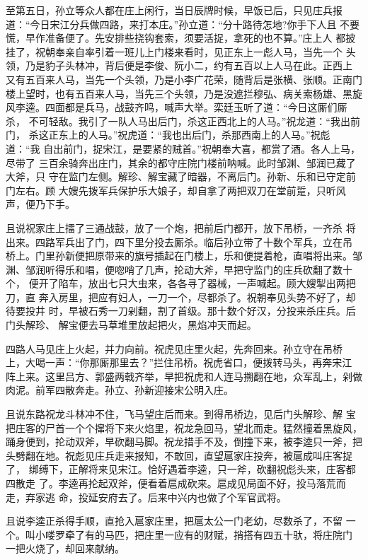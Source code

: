 至第五日，孙立等众人都在庄上闲行，当日辰牌时候，早饭已后，只见庄兵报
道：“今日宋江分兵做四路，来打本庄。”孙立道：“分十路待怎地?你手下人且
不要慌，早作准备便了。先安排些挠钩套索，须要活捉，拿死的也不算。”庄上人
都披挂了，祝朝奉亲自率引着一班儿上门楼来看时，见正东上一彪人马，当先一个
头领，乃是豹子头林冲，背后便是李俊、阮小二，约有五百以上人马在此。正西上
又有五百来人马，当先一个头领，乃是小李广花荣，随背后是张横、张顺。正南门
楼上望时，也有五百来人马，当先三个头领，乃是没遮拦穆弘、病关索杨雄、黑旋
风李逵。四面都是兵马，战鼓齐鸣，喊声大举。栾廷玉听了道：“今日这厮们厮杀，
不可轻敌。我引了一队人马出后门，杀这正西北上的人马。”祝龙道：“我出前门，
杀这正东上的人马。”祝虎道：“我也出后门，杀那西南上的人马。”祝彪道：“我
自出前门，捉宋江，是要紧的贼首。”祝朝奉大喜，都赏了酒。各人上马，尽带了
三百余骑奔出庄门，其余的都守庄院门楼前呐喊。此时邹渊、邹润已藏了大斧，只
守在监门左侧。解珍、解宝藏了暗器，不离后门。孙新、乐和已守定前门左右。顾
大嫂先拨军兵保护乐大娘子，却自拿了两把双刀在堂前踅，只听风声，便乃下手。

且说祝家庄上擂了三通战鼓，放了一个炮，把前后门都开，放下吊桥，一齐杀
将出来。四路军兵出了门，四下里分投去厮杀。临后孙立带了十数个军兵，立在吊
桥上。门里孙新便把原带来的旗号插起在门楼上，乐和便提着枪，直唱将出来。邹
渊、邹润听得乐和唱，便唿哨了几声，抡动大斧，早把守监门的庄兵砍翻了数十个，
便开了陷车，放出七只大虫来，各各寻了器械，一声喊起。顾大嫂掣出两把刀，直
奔入房里，把应有妇人，一刀一个，尽都杀了。祝朝奉见头势不好了，却待要投井
时，早被石秀一刀剁翻，割了首级。那十数个好汉，分投来杀庄兵。后门头解珍、
解宝便去马草堆里放起把火，黑焰冲天而起。

四路人马见庄上火起，并力向前。祝虎见庄里火起，先奔回来。孙立守在吊桥
上，大喝一声：“你那厮那里去？”拦住吊桥。祝虎省口，便拨转马头，再奔宋江
阵上来。这里吕方、郭盛两戟齐举，早把祝虎和人连马搠翻在地，众军乱上，剁做
肉泥。前军四散奔走。孙立、孙新迎接宋公明入庄。

且说东路祝龙斗林冲不住，飞马望庄后而来。到得吊桥边，见后门头解珍、解
宝把庄客的尸首一个个撺将下来火焰里，祝龙急回马，望北而走。猛然撞着黑旋风，
踊身便到，抡动双斧，早砍翻马脚。祝龙措手不及，倒撞下来，被李逵只一斧，把
头劈翻在地。祝彪见庄兵走来报知，不敢回，直望扈家庄投奔，被扈成叫庄客捉了，
绑缚下，正解将来见宋江。恰好遇着李逵，只一斧，砍翻祝彪头来，庄客都四散走
了。李逵再抡起双斧，便看着扈成砍来。扈成见局面不好，投马落荒而走，弃家逃
命，投延安府去了。后来中兴内也做了个军官武将。

且说李逵正杀得手顺，直抢入扈家庄里，把扈太公一门老幼，尽数杀了，不留
一个。叫小喽罗牵了有的马匹，把庄里一应有的财赋，捎搭有四五十驮，将庄院门
一把火烧了，却回来献纳。

